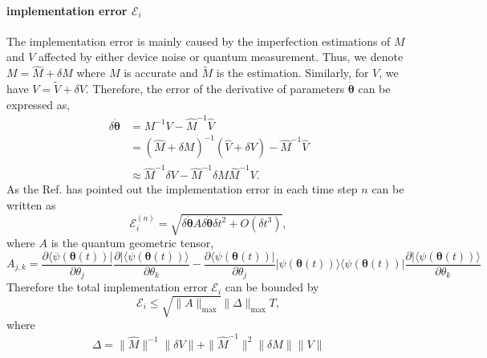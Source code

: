 \documentclass[twocolumn,
pra,aps,superscriptaddress,showpacs,amsmath,amssymb]{revtex4-2}
\begin{document}
\paragraph{implementation error $\mathcal{E}_i$}
The implementation error is mainly caused by the imperfection estimations of $M$ and $V$ affected by either device noise or quantum measurement. Thus, we denote $M = \hat{M} + \delta M$ where $M$ is accurate and $\tilde{M}$ is the estimation. Similarly, for $V$, we have $V = \tilde{V} + \delta V$. Therefore, the error of the derivative of parameters $\dot{\bm{\theta}}$ can be expressed as,
\begin{align}
    \delta \dot{\bm{\theta}} & = M^{-1}V - \hat{M}^{-1}\hat{V}\\
    & =  (\hat{M} + \delta M)^{-1}(\hat{V}+\delta V) - \hat{M}^{-1}\hat{V}\\
    & \approx \hat{M}^{-1}\delta V - \hat{M}^{-1}\delta M \hat{M}^{-1} V.
\end{align}
As the Ref. \cite{li2017efficient} has pointed out the implementation error in each time step $n$ can be written as
\begin{equation}
\mathcal{E}_i^{(n)} = \sqrt{\delta \dot{\bm{\theta}} A \delta \dot{\bm{\theta}} \delta t^2 + O(\delta t^3)},
\end{equation}
where $A$ is the  quantum geometric tensor,
\begin{equation}
A_{j,k} = \frac{\partial{\langle \psi(\bm{\theta}(t))|}}{\partial \theta_j}\frac{\partial{|{\langle \psi(\bm{\theta}(t))\rangle}}}{\partial \theta_k} -\frac{\partial{\langle \psi(\bm{\theta}(t))|}}{\partial \theta_j} |\psi(\bm{\theta}(t))\rangle \langle \psi(\bm{\theta}(t))| \frac{\partial{|{\langle \psi(\bm{\theta}(t))\rangle}}}{\partial \theta_k} 
\end{equation}
Therefore the total implementation error $\mathcal{E}_i$ can be bounded by
\begin{equation}
\mathcal{E}_i \leq \sqrt{\|A\|_{\max}}\|\Delta\|_{\max} T,
\end{equation}
where
\begin{equation}
\Delta = \|\hat{M}\|^{-1}\|\delta V\| + \| \hat{M}^{-1}\|^2 \|\delta M\| \|V\|
\end{equation}
\end{document}
